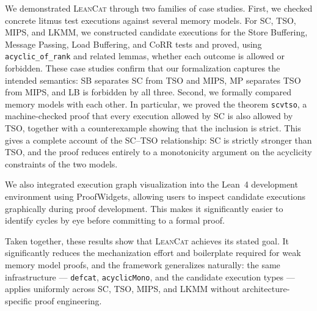We demonstrated \textsc{LeanCat} through two families of case studies. First, we checked concrete litmus test executions against several memory models. For SC, TSO, MIPS, and LKMM, we constructed candidate executions for the Store Buffering, Message Passing, Load Buffering, and CoRR tests and proved, using \texttt{acyclic\_of\_rank} and related lemmas, whether each outcome is allowed or forbidden. These case studies confirm that our formalization captures the intended semantics: SB separates SC from TSO and MIPS, MP separates TSO from MIPS, and LB is forbidden by all three. Second, we formally compared memory models with each other. In particular, we proved the theorem \texttt{scvtso}, a machine-checked proof that every execution allowed by SC is also allowed by TSO, together with a counterexample showing that the inclusion is strict. This gives a complete account of the SC--TSO relationship: SC is strictly stronger than TSO, and the proof reduces entirely to a monotonicity argument on the acyclicity constraints of the two models.

We also integrated execution graph visualization into the Lean~4 development environment using ProofWidgets, allowing users to inspect candidate executions graphically during proof development. This makes it significantly easier to identify cycles by eye before committing to a formal proof.

Taken together, these results show that \textsc{LeanCat} achieves its stated goal. It significantly reduces the mechanization effort and boilerplate required for weak memory model proofs, and the framework generalizes naturally: the same infrastructure --- \texttt{defcat}, \texttt{acyclicMono}, and the candidate execution types --- applies uniformly across SC, TSO, MIPS, and LKMM without architecture-specific proof engineering.

